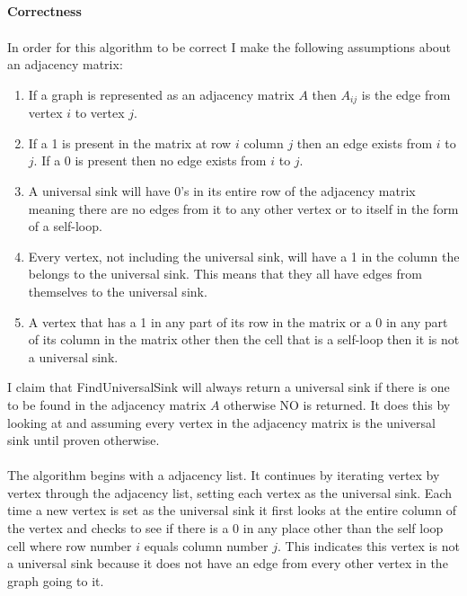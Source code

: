 \documentclass[12pt]{article}
\begin{document}
\begin{enumerate}
\begin{verbatim}
	               
	            	
	                
	       
	\end{verbatim}
	\textbf{Correctness}\\
	\\
	In order for this algorithm to be correct I make the following assumptions about an adjacency matrix:
	\begin{enumerate}
		\item If a graph is represented as an adjacency matrix $A$ then $A_{ij}$ is the edge from vertex $i$ to vertex $j$. \\ 
		\item If a 1 is present in the matrix at row $i$ column $j$ then an edge exists from $i$ to $j$.  If a 0 is present then no edge exists from $i$ to $j$.\\
		\item A universal sink will have 0's in its entire row of the adjacency matrix meaning there are no edges from it to any other vertex or to itself in the form of a self-loop.\\  
		\item Every vertex, not including the universal sink, will have a 1 in the column the belongs to the universal sink.  This means that they all have edges from themselves to the universal sink.\\
		\item A vertex that has a 1 in any part of its row in the matrix or a 0 in any part of its column in the matrix other then the cell that is a self-loop then it is not a universal sink.\\
	\end{enumerate}
	I claim that FindUniversalSink will always return a universal sink if there is one to be found in the adjacency matrix $A$ otherwise NO is returned.  
	It does this by looking at and assuming every vertex in the adjacency matrix is the universal sink until proven otherwise.\\
	\\
	The algorithm begins with a adjacency list.  It continues by iterating vertex by vertex through the adjacency list, setting each vertex as the universal sink.  
	Each time a new vertex is set as the universal sink it first looks at the entire column of the vertex and checks to see if there is a 0 in any place other than the self loop cell where row number $i$ equals column number $j$.     
	This indicates this vertex is not a universal sink because it does not have an edge from every other vertex in the graph going to it.

\end{enumerate}
\end{document}
